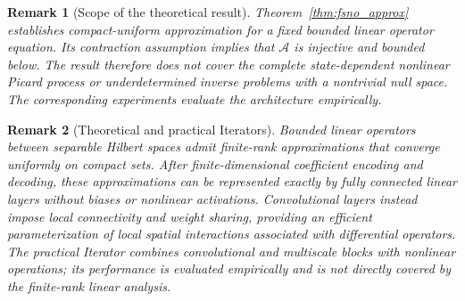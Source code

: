 \documentclass[preprint,numbers,sort&compress]{elsarticle}
\newtheorem{remark}{Remark}
\begin{document}
		{\begin{remark}[Scope of the theoretical result]
				\label{rem:theoretical_scope}
				Theorem~\ref{thm:fsno_approx} establishes compact-uniform
				approximation for a fixed bounded linear operator equation.
				Its contraction assumption implies that $\mathcal A$ is injective
				and bounded below. The result therefore does not cover the complete
				state-dependent nonlinear Picard process or underdetermined inverse
				problems with a nontrivial null space. The corresponding experiments
				evaluate the architecture empirically.
			\end{remark}
			
			\begin{remark}[Theoretical and practical Iterators]\label{rem:fcn_cnn_relation}
				Bounded linear operators between separable Hilbert spaces admit
				finite-rank approximations that converge uniformly on compact sets.
				After finite-dimensional coefficient encoding and decoding,
				these approximations can be represented exactly by fully connected
				linear layers without biases or nonlinear activations.
				Convolutional layers instead impose local connectivity and weight
				sharing, providing an efficient parameterization of local spatial
				interactions associated with differential operators.
				The practical Iterator combines convolutional and multiscale
				blocks with nonlinear operations; its performance is evaluated
				empirically and is not directly covered by the finite-rank linear
				analysis.
		\end{remark}}
		
\end{document}
